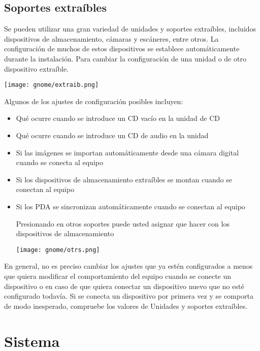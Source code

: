 \subsection{Soportes extraíbles}
Se pueden utilizar una gran variedad de unidades y soportes extraíbles, incluidos dispositivos de almacenamiento, cámaras y escáneres, entre otros. La configuración de muchos de estos dispositivos se establece automáticamente durante la instalación. Para cambiar la configuración de una unidad o de otro dispositivo extraíble.
\begin{center}
\texttt{[image: gnome/extraib.png]}
\end{center}
Algunos de los ajustes de configuración posibles incluyen:
\begin{itemize}
\item Qué ocurre cuando se introduce un CD vacío en la unidad de CD
\item Qué ocurre cuando se introduce un CD de audio en la unidad
\item Si las imágenes se importan automáticamente desde una cámara digital cuando se conecta al equipo
\item Si los dispositivos de almacenamiento extraíbles se montan cuando se conectan al equipo
\item Si los PDA se sincronizan automáticamente cuando se conectan al equipo
\begin{multicols}{2}
Presionando en otros soportes puede usted asignar que hacer con los dispositivos de almacenamiento

\texttt{[image: gnome/otrs.png]} 
\end{multicols}
\end{itemize}
En general, no es preciso cambiar los ajustes que ya estén configurados a menos que quiera modificar el comportamiento del equipo cuando se conecte un dispositivo o en caso de que quiera conectar un dispositivo nuevo que no esté configurado todavía. Si se conecta un dispositivo por primera vez y se comporta de modo inesperado, compruebe los valores de Unidades y soportes extraíbles.

\section{Sistema}
